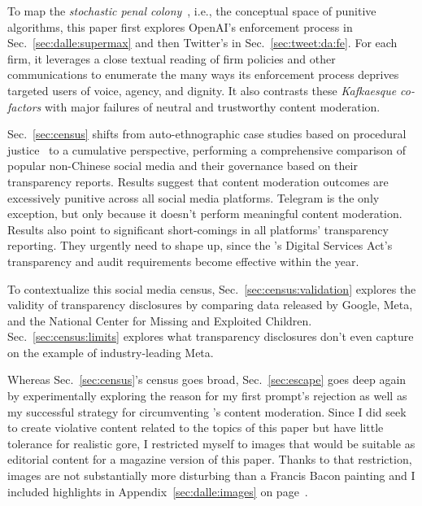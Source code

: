 To map the \emph{stochastic penal colony}~, i.e., the
conceptual space of punitive algorithms, this paper first explores OpenAI's
enforcement process in Sec.~\ref{sec:dalle:supermax} and then Twitter's in
Sec.~\ref{sec:tweet:da:fe}. For each firm, it leverages a close textual reading
of firm policies and other communications to enumerate the many ways its
enforcement process deprives targeted users of voice, agency, and dignity. It
also contrasts these \emph{Kafkaesque co-factors} with major failures of neutral
and trustworthy content moderation.

Sec.~\ref{sec:census} shifts from auto-ethnographic case studies based on
procedural justice~\cite{Tyler2003,Tyler2006,Tyler2007} to a cumulative
perspective, performing a comprehensive comparison of popular non-Chinese social
media and their governance based on their transparency reports. Results suggest
that content moderation outcomes are excessively punitive across all social
media platforms. Telegram is the only exception, but only because it doesn't
perform meaningful content moderation. Results also point to significant
short-comings in all platforms' transparency reporting. They urgently need to
shape up, since the \EU's Digital Services Act's transparency and audit
requirements become effective within the year.

To contextualize this social media census, Sec.\ \ref{sec:census:validation}
explores the validity of transparency disclosures by comparing data released by
Google, Meta, and the National Center for Missing and Exploited Children.
Sec.~\ref{sec:census:limits} explores what transparency disclosures don't even
capture on the example of industry-leading Meta.

Whereas Sec.~\ref{sec:census}'s census goes broad, Sec.~\ref{sec:escape} goes
deep again by experimentally exploring the reason for my first prompt's
rejection as well as my successful strategy for circumventing \DALLE's content
moderation. Since I did seek to create violative content related to the topics
of this paper but have little tolerance for realistic gore, I restricted myself
to images that would be suitable as editorial content for a magazine version of
this paper. Thanks to that restriction, images are not substantially more
disturbing than a Francis Bacon painting and I included highlights in
Appendix~\ref{sec:dalle:images} on
page~\pageref{sec:dalle:images}.

